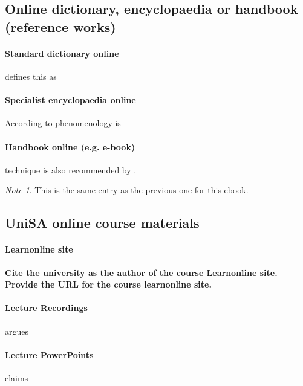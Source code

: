 \documentclass[a4paper,australian,oneside,12pt,footlines=3]{scrbook}%
\newcommand{\instruction}[1]{\textbf{#1}}
\theoremstyle{remark}
\newtheorem*{note}{Note}
\begin{document}
\begin{refsection}
\section{Online dictionary, encyclopaedia or handbook (reference works)}
\paragraph{Standard dictionary online}
\textcite{EOLD2016} defines this as \textelp{}

\paragraph{Specialist encyclopaedia online}
According to \textcite{Smith2011} phenomenology is \textelp{}

\paragraph{Handbook online (e.g. e-book)}
\textelp{}technique is also recommended by \textcite{Flann2014}.
\begin{note}
This is the same entry as the previous one for this ebook.
\end{note}
\printbibliography[heading=subbibliography]
\end{refsection}

\begin{refsection}
\section{UniSA online course materials}
\paragraph{Learnonline site}
\instruction{Cite the university as the author of the course Learnonline site. Provide the URL for the course learnonline site.}
\textelp{} \parencite{MEDI1001}

\paragraph{Lecture Recordings}
\textcite{MEDI1001lr} argues\textelp{}

\paragraph{Lecture PowerPoints}
\textcite{MEDI1001ppt} claims\textelp{}
\printbibliography[heading=subbibliography]
\end{refsection}
\end{document}
